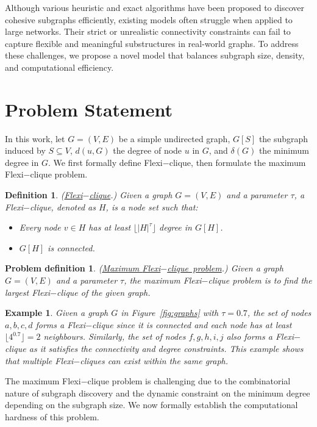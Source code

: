 \documentclass[sigconf]{acmart}
\newtheorem{problemDefinition}{Problem definition}
\newtheorem{definition}{Definition}
\newtheorem{example}{Example}
\newcommand{\flexi}{\textsf{Flexi$-$clique}}
\begin{document}
Although various heuristic and exact algorithms have been proposed to discover cohesive subgraphs efficiently, existing models often struggle when applied to large networks. Their strict or unrealistic connectivity constraints can fail to capture flexible and meaningful substructures in real-world graphs. To address these challenges, we propose a novel model that balances subgraph size, density, and computational efficiency.


\section{Problem Statement}

In this work, let $G=(V, E)$ be a simple undirected graph, $G[S]$ the subgraph induced by $S \subseteq V$, $d(u, G)$ the degree of node $u$ in $G$, and $\delta(G)$ the minimum degree in $G$. We first formally define {\flexi}, then formulate the maximum {\flexi} problem.

\begin{definition}
(\underline{\flexi}.) Given a graph $G = (V, E)$ and a parameter $\tau$, a {\flexi}, denoted as $H$, is a node set such that:
\begin{itemize}
\item Every node $v \in H$ has at least $\lfloor |H|^\tau \rfloor$ degree in $G[H]$.
\item $G[H]$ is connected.
\end{itemize}
\end{definition}

\begin{problemDefinition}
(\underline{Maximum \flexi \, problem}.) Given a graph $G = (V, E)$ and a parameter $\tau$, the maximum {\flexi} problem is to find the largest {\flexi} of the given graph.
\end{problemDefinition}


\begin{example}
Given a graph $G$ in Figure~\ref{fig:graphs} with $\tau = 0.7$, the set of nodes ${a, b, c, d}$ forms a {\flexi} since it is connected and each node has at least $\lfloor 4^{0.7} \rfloor = 2$ neighbours. Similarly, the set of nodes ${f, g, h, i, j}$ also forms a {\flexi} as it satisfies the connectivity and degree constraints. This example shows that multiple {\flexi}s can exist within the same graph.
\end{example}


The maximum {\flexi} problem is challenging due to the combinatorial nature of subgraph discovery and the dynamic constraint on the minimum degree depending on the subgraph size. We now formally establish the computational hardness of this problem.
\end{document}
